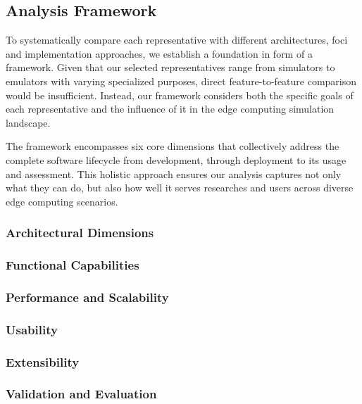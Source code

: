 \subsection{Analysis Framework}
To systematically compare each representative with different architectures, foci and implementation approaches, we establish a foundation in form of a framework.
Given that our selected representatives range from simulators to emulators with varying specialized purposes, direct feature-to-feature comparison would be insufficient.
Instead, our framework considers both the specific goals of each representative and the influence of it in the edge computing simulation landscape.

The framework encompasses six core dimensions that collectively address the complete software lifecycle from development, through deployment to its usage and assessment.
This holistic approach ensures our analysis captures not only what they can do, but also how well it serves researches and users across diverse edge computing scenarios.

\subsubsection{Architectural Dimensions}

\subsubsection{Functional Capabilities}

\subsubsection{Performance and Scalability}

\subsubsection{Usability}

\subsubsection{Extensibility}

\subsubsection{Validation and Evaluation}

